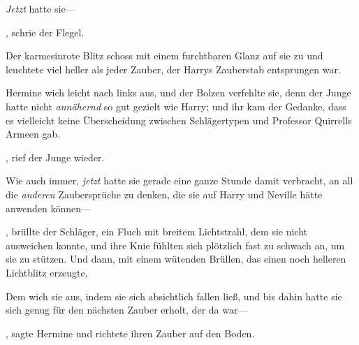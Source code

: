 \emph{Jetzt} hatte sie—

, schrie der Flegel.

Der karmesinrote Blitz schoss mit einem furchtbaren Glanz auf sie zu und leuchtete viel heller als jeder Zauber, der Harrys Zauberstab entsprungen war.

Hermine wich leicht nach links aus, und der Bolzen verfehlte sie, denn der Junge hatte nicht \emph{annähernd} so gut gezielt wie Harry; und ihr kam der Gedanke, dass es vielleicht keine Überscheidung zwischen Schlägertypen und Professor Quirrells Armeen gab.

, rief der Junge wieder. 

Wie auch immer, \emph{jetzt} hatte sie gerade eine ganze Stunde damit verbracht, an all die \emph{anderen} Zaubersprüche zu denken, die sie auf Harry und Neville hätte anwenden können—

, brüllte der Schläger, ein Fluch mit breitem Lichtstrahl, dem sie nicht ausweichen konnte, und ihre Knie fühlten sich plötzlich fast zu schwach an, um sie zu stützen. Und dann, mit einem wütenden Brüllen, das einen noch helleren Lichtblitz erzeugte, 

Dem wich sie aus, indem sie sich absichtlich fallen ließ, und bis dahin hatte sie sich genug für den nächsten Zauber erholt, der da war—

, sagte Hermine und richtete ihren Zauber auf den Boden.

